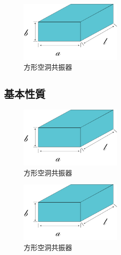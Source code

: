 \vspace{10 mm}

\begin{figure}[h]
  \begin{center}
    \includegraphics[width=5cm]{./image/空洞共振器.png}
    \caption{方形空洞共振器}
    \label{fig:Cavity}
  \end{center}
\end{figure}

\subsection{基本性質}
\vspace{10 mm}

\begin{figure}[h]
  \begin{center}
    \includegraphics[width=5cm]{./image/空洞共振器.png}
    \caption{方形空洞共振器}
    \label{fig:Cavity}
  \end{center}
\end{figure}

\vspace{10 mm}

\begin{figure}[h]
  \begin{center}
    \includegraphics[width=5cm]{./image/空洞共振器.png}
    \caption{方形空洞共振器}
    \label{fig:Cavity}
  \end{center}
\end{figure}

\vspace{10 mm}

